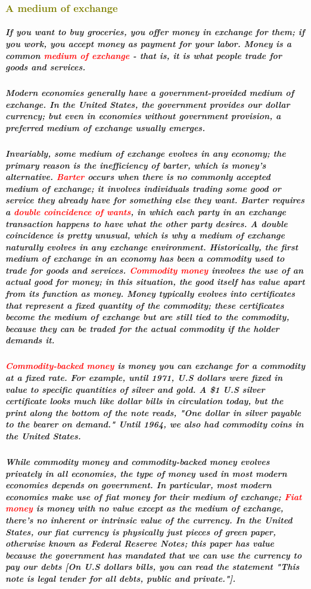 \documentclass[11pt]{article} %
\begin{document}
\subsubsection*{\textcolor{olive}{A medium of exchange}}
\subparagraph*{
If you want to buy groceries, you offer money in exchange for them; if you work, you accept money as payment for your labor. Money is a common \textbf{\textcolor{red}{medium of exchange}} - that is, it is what people trade for goods and services.
}
\subparagraph*{
Modern economies generally have a government-provided medium of exchange. In the United States, the government provides our dollar currency; but even in economies without government provision, a preferred medium of exchange usually emerges.
}
\subparagraph*{
Invariably, some medium of exchange evolves in any economy; the primary reason is the inefficiency of barter, which is money's alternative. \textbf{\textcolor{red}{Barter}} occurs when there is no commonly accepted medium of exchange; it involves individuals trading some good or service they already have for something else they want. Barter requires a \textbf{\textcolor{red}{double coincidence of wants}}, in which each party in an exchange transaction happens to have what the other party desires. A double coincidence is pretty unusual, which is why a medium of exchange naturally evolves in any exchange environment.
Historically, the first medium of exchange in an economy has been a commodity used to trade for goods and services. \textbf{\textcolor{red}{Commodity money}} involves the use of an actual good for money; in this situation, the good itself has value apart from its function as money. Money typically evolves into certificates that represent a fixed quantity of the commodity; these certificates become the medium of exchange but are still tied to the commodity, because they can be traded for the actual commodity if the holder demands it.
}
\subparagraph*{
\textbf{\textcolor{red}{Commodity-backed money}} is money you can exchange for a commodity at a fixed rate. For example, until 1971, U.S dollars were fixed in value to specific quantities of silver and gold. A \$1 U.S silver certificate looks much like dollar bills in circulation today, but the print along the bottom of the note reads, "One dollar in silver payable to the bearer on demand." Until 1964, we also had commodity coins in the United States.
}
\subparagraph*{
While commodity money and commodity-backed money evolves privately in all economies, the type of money used in most modern economies depends on government. In particular, most modern economies make use of fiat money for their medium of exchange; \textbf{\textcolor{red}{Fiat money}} is money with no value except as the medium of exchange, there's no inherent or intrinsic value of the currency. In the United States, our fiat currency is physically just pieces of green paper, otherwise known as Federal Reserve Notes; this paper has value because the government has mandated that we can use the currency to pay our debts [On U.S dollars bills, you can read the statement "This note is legal tender for all debts, public and private."].
}
\end{document}
